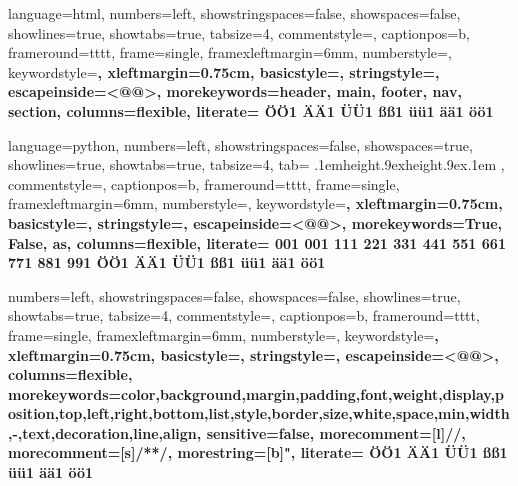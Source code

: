 \newcommand\widevisiblespace{%
\kern.1em\hbox{\vrule height.9ex}\hrulefill\hbox{\vrule height.9ex}\kern.1em
}

{
language=html,
numbers=left,
showstringspaces={false},
showspaces={false}, 
showlines={true},
showtabs={true},
tabsize={4},
commentstyle=\color{commentcolor},
captionpos=b,
frameround=tttt,
frame=single,
framexleftmargin=6mm,
numberstyle=\tiny,
keywordstyle=\color{keywordcolor}\ttfamily\bfseries,
xleftmargin=0.75cm,
basicstyle=\ttfamily,
stringstyle=\color{textcolor},
escapeinside={<@}{@>},
morekeywords={header, main, footer, nav, section},
columns=flexible,
literate=%
{Ö}{{\"O}}1
{Ä}{{\"A}}1
{Ü}{{\"U}}1
{ß}{{\ss}}1
{ü}{{\"u}}1
{ä}{{\"a}}1
{ö}{{\"o}}1
}

\makeatletter
{}
{
language=python,
numbers=left,
showstringspaces={false},
showspaces={true}, 
showlines={true},
showtabs={true},
tabsize={4},
tab={\color{spacecolor}\widevisiblespace},
commentstyle=\color{commentcolor},
captionpos=b,
frameround=tttt,
frame=single,
framexleftmargin=6mm,
numberstyle=\tiny,
keywordstyle=\color{keywordcolor}\ttfamily\bfseries,
xleftmargin=0.75cm,
basicstyle=\ttfamily,
stringstyle=\color{textcolor},
escapeinside={<@}{@>},
morekeywords={True, False, as},
columns=flexible,
literate=%
{0}{{{\color{red}0}}}1
{0}{{{\color{numbercolor}0}}}1
{1}{{{\color{numbercolor}1}}}1
{2}{{{\color{numbercolor}2}}}1
{3}{{{\color{numbercolor}3}}}1
{4}{{{\color{numbercolor}4}}}1
{5}{{{\color{numbercolor}5}}}1
{6}{{{\color{numbercolor}6}}}1
{7}{{{\color{numbercolor}7}}}1
{8}{{{\color{numbercolor}8}}}1
{9}{{{\color{numbercolor}9}}}1
{Ö}{{\"O}}1
{Ä}{{\"A}}1
{Ü}{{\"U}}1
{ß}{{\ss}}1
{ü}{{\"u}}1
{ä}{{\"a}}1
{ö}{{\"o}}1
}
\makeatother

{
numbers=left,
showstringspaces={false},
showspaces={false}, 
showlines={true},
showtabs={true},
tabsize={4},
commentstyle=\color{commentcolor},
captionpos=b,
frameround=tttt,
frame=single,
framexleftmargin=6mm,
numberstyle=\tiny,
keywordstyle=\color{keywordcolor}\ttfamily\bfseries,
xleftmargin=0.75cm,
basicstyle=\ttfamily,
stringstyle=\color{textcolor},
escapeinside={<@}{@>},
columns=flexible,
morekeywords={color,background,margin,padding,font,weight,display,position,top,left,right,bottom,list,style,border,size,white,space,min,width,-,text,decoration,line,align},
sensitive=false,
morecomment=[l]{//},
morecomment=[s]{/*}{*/},
morestring=[b]",
literate=%
{Ö}{{\"O}}1
{Ä}{{\"A}}1
{Ü}{{\"U}}1
{ß}{{\ss}}1
{ü}{{\"u}}1
{ä}{{\"a}}1
{ö}{{\"o}}1
}

